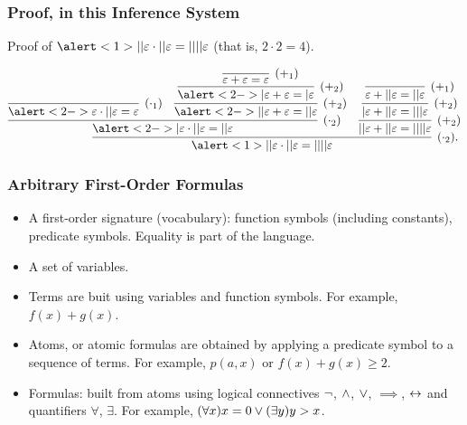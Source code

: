 
                    \begin{frame}\frametitle{Proof,  in this Inference System}

Proof of $\alert<1>{||\varepsilon \cdot ||\varepsilon = ||||\varepsilon}$
(that is, $2 \cdot 2 = 4$).\\[1em]


\bigskip

  \[\M{
    \infer[(\cdot_2).]{\alert<1>{||\varepsilon \cdot ||\varepsilon = ||||\varepsilon}}{
      \infer[(\cdot_2)]{\alert<2->{|\varepsilon \cdot ||\varepsilon = ||\varepsilon}}{
        \infer[(\cdot_1)]{\alert<2->{\varepsilon \cdot ||\varepsilon = \varepsilon}}{}
        &
        \infer[(+_2)]{\alert<2->{||\varepsilon + \varepsilon = ||\varepsilon}}{
          \infer[(+_2)]{\alert<2->{|\varepsilon + \varepsilon = |\varepsilon}}{
            \infer[(+_1)]{\varepsilon + \varepsilon = \varepsilon}{}
          }
        }
      }
      & 
      \infer[(+_2)]{||\varepsilon + ||\varepsilon = ||||\varepsilon}{
        \infer[(+_2)]{|\varepsilon + ||\varepsilon = |||\varepsilon}{
          \infer[(+_1)]{\varepsilon + ||\varepsilon = ||\varepsilon}{}
        }
      }
    }
  }\]


                           \end{frame}


                      \begin{frame}
            \frametitle{Arbitrary First-Order Formulas}

\begin{itemize}
\item A \alert{first-order signature (vocabulary)}: function symbols (including 
  constants), predicate symbols. \alert{Equality} is part of the
  language.

\item A set of \alert{variables}.

\item \alert{Terms} are buit using variables and function symbols. For
  example, $f(x) + g(x)$.

\item \alert{Atoms}, or \alert{atomic formulas} are obtained by
  applying a predicate symbol to a sequence of terms. For example,
  $p(a,x)$ or $f(x) + g(x) \geq 2$.

\item \alert{Formulas:} built from atoms using logical
    connectives $\neg$, $\wedge$, $\vee$, $\implies$, $\leftrightarrow$ and
    quantifiers $\forall$, $\exists$. For example,
  $(\forall x)x = 0 \vee (\exists y)y > x$.
\end{itemize}


                                \end{frame}

